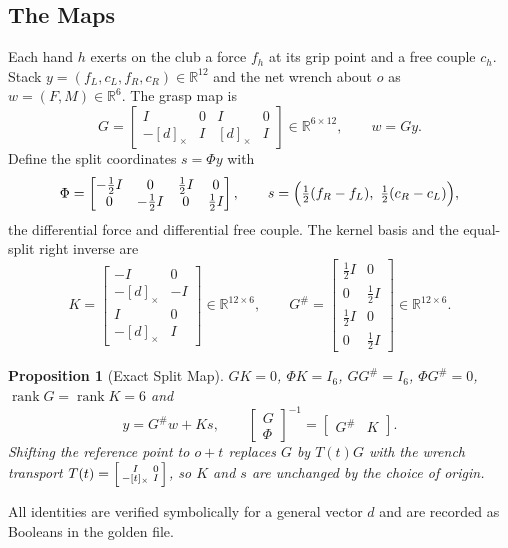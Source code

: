 \documentclass[11pt,a4paper]{article}
\newtheorem{proposition}{Proposition}
\newcommand{\R}{\mathbb{R}}
\newcommand{\rank}{\operatorname{rank}}
\newcommand{\skewm}[1]{[#1]_{\times}}
\begin{document}
\subsection{The Maps}
Each hand $h$ exerts on the club a force $f_h$ at its grip point and a free
couple $c_h$.  Stack $y=(f_L,c_L,f_R,c_R)\in\R^{12}$ and the net wrench about
$o$ as $w=(F,M)\in\R^6$.  The grasp map is
\begin{equation}
G=\begin{bmatrix}I&0&I&0\\ -\skewm{d}&I&\skewm{d}&I\end{bmatrix}\in\R^{6\times12},
\qquad w=Gy.
\end{equation}
Define the split coordinates $s=\Phi y$ with
\begin{equation}
\Phi=\begin{bmatrix}-\tfrac12 I&0&\tfrac12 I&0\\
0&-\tfrac12 I&0&\tfrac12 I\end{bmatrix},\qquad
s=\Bigl(\tfrac12(f_R-f_L),\ \tfrac12(c_R-c_L)\Bigr),
\end{equation}
the differential force and differential free couple.  The kernel basis and the
equal-split right inverse are
\begin{equation}
K=\begin{bmatrix}-I&0\\-\skewm{d}&-I\\ I&0\\-\skewm{d}&I\end{bmatrix}\in\R^{12\times6},
\qquad
G^{\#}=\begin{bmatrix}\tfrac12 I&0\\0&\tfrac12 I\\ \tfrac12 I&0\\0&\tfrac12 I
\end{bmatrix}\in\R^{12\times6}.
\end{equation}

\begin{proposition}[Exact Split Map]\label{prop:grasp}
$GK=0$, $\Phi K=I_6$, $GG^{\#}=I_6$, $\Phi G^{\#}=0$, $\rank G=\rank K=6$ and
\begin{equation}
y=G^{\#}w+Ks,\qquad
\begin{bmatrix}G\\ \Phi\end{bmatrix}^{-1}=\begin{bmatrix}G^{\#}&K\end{bmatrix}.
\end{equation}
Shifting the reference point to $o+t$ replaces $G$ by $T(t)G$ with the wrench
transport $T(t)=\begin{bsmallmatrix}I&0\\-\skewm{t}&I\end{bsmallmatrix}$, so
$K$ and $s$ are unchanged by the choice of origin.
\end{proposition}
All identities are verified symbolically for a general vector $d$ and are
recorded as Booleans in the golden file.
\end{document}
